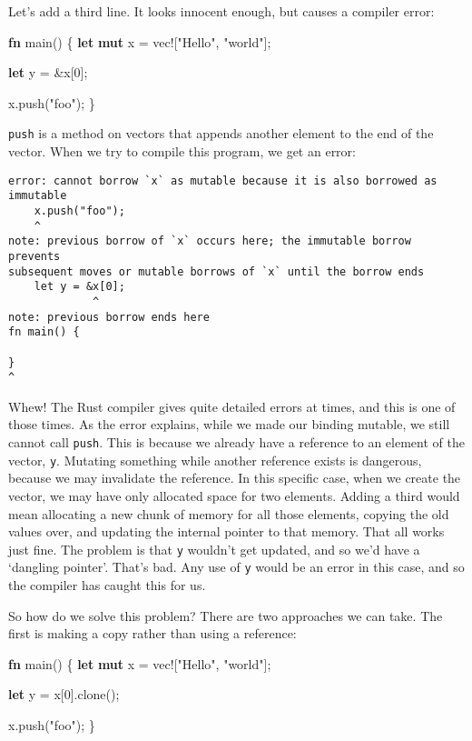 \documentclass[a4paper,]{book}
\newenvironment{Shaded}{\begin{snugshade}}{\end{snugshade}}
\newcommand{\KeywordTok}[1]{\textcolor[rgb]{0.13,0.29,0.53}{\textbf{{#1}}}}
\newcommand{\DecValTok}[1]{\textcolor[rgb]{0.00,0.00,0.81}{{#1}}}
\newcommand{\StringTok}[1]{\textcolor[rgb]{0.31,0.60,0.02}{{#1}}}
\newcommand{\OtherTok}[1]{\textcolor[rgb]{0.56,0.35,0.01}{{#1}}}
\newcommand{\NormalTok}[1]{{#1}}
\begin{document}
Let's add a third line. It looks innocent enough, but causes a compiler
error:

\begin{Shaded}
\begin{Highlighting}[]
\KeywordTok{fn} \NormalTok{main() \{}
    \KeywordTok{let} \KeywordTok{mut} \NormalTok{x = }\OtherTok{vec!}\NormalTok{[}\StringTok{"Hello"}\NormalTok{, }\StringTok{"world"}\NormalTok{];}

    \KeywordTok{let} \NormalTok{y = &x[}\DecValTok{0}\NormalTok{];}

    \NormalTok{x.push(}\StringTok{"foo"}\NormalTok{);}
\NormalTok{\}}
\end{Highlighting}
\end{Shaded}

\texttt{push} is a method on vectors that appends another element to the
end of the vector. When we try to compile this program, we get an error:

\begin{verbatim}
error: cannot borrow `x` as mutable because it is also borrowed as immutable
    x.push("foo");
    ^
note: previous borrow of `x` occurs here; the immutable borrow prevents
subsequent moves or mutable borrows of `x` until the borrow ends
    let y = &x[0];
             ^
note: previous borrow ends here
fn main() {

}
^
\end{verbatim}

Whew! The Rust compiler gives quite detailed errors at times, and this
is one of those times. As the error explains, while we made our binding
mutable, we still cannot call \texttt{push}. This is because we already
have a reference to an element of the vector, \texttt{y}. Mutating
something while another reference exists is dangerous, because we may
invalidate the reference. In this specific case, when we create the
vector, we may have only allocated space for two elements. Adding a
third would mean allocating a new chunk of memory for all those
elements, copying the old values over, and updating the internal pointer
to that memory. That all works just fine. The problem is that \texttt{y}
wouldn't get updated, and so we'd have a `dangling pointer'. That's bad.
Any use of \texttt{y} would be an error in this case, and so the
compiler has caught this for us.

So how do we solve this problem? There are two approaches we can take.
The first is making a copy rather than using a reference:

\begin{Shaded}
\begin{Highlighting}[]
\KeywordTok{fn} \NormalTok{main() \{}
    \KeywordTok{let} \KeywordTok{mut} \NormalTok{x = }\OtherTok{vec!}\NormalTok{[}\StringTok{"Hello"}\NormalTok{, }\StringTok{"world"}\NormalTok{];}

    \KeywordTok{let} \NormalTok{y = x[}\DecValTok{0}\NormalTok{].clone();}

    \NormalTok{x.push(}\StringTok{"foo"}\NormalTok{);}
\NormalTok{\}}
\end{Highlighting}
\end{Shaded}
\end{document}
